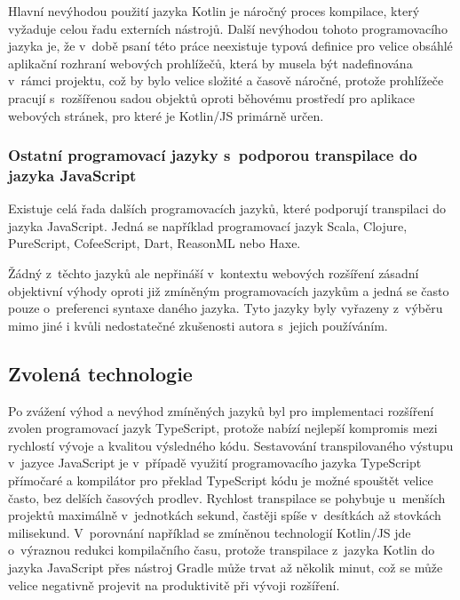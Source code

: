 Hlavní nevýhodou použití jazyka Kotlin je náročný proces kompilace, který vyžaduje celou řadu externích nástrojů. Další nevýhodou tohoto programovacího jazyka je, že v~době psaní této práce neexistuje typová definice pro velice obsáhlé aplikační rozhraní webových prohlížečů, která by musela být nadefinována v~rámci projektu, což by bylo velice složité a časově náročné, protože prohlížeče pracují s~rozšířenou sadou objektů oproti běhovému prostředí pro aplikace webových stránek, pro které je Kotlin/JS primárně určen.


\subsubsection{Ostatní programovací jazyky s~podporou transpilace do jazyka JavaScript}

Existuje celá řada dalších programovacích jazyků, které podporují transpilaci do jazyka JavaScript. Jedná se například programovací jazyk Scala, Clojure, PureScript, CofeeScript, Dart, ReasonML nebo Haxe.

Žádný z~těchto jazyků ale nepřináší v~kontextu webových rozšíření zásadní objektivní výhody oproti již zmíněným programovacích jazykům a jedná se často pouze o~preferenci syntaxe daného jazyka. Tyto jazyky byly vyřazeny z~výběru mimo jiné i kvůli nedostatečné zkušenosti autora s~jejich používáním.  

\subsection{Zvolená technologie}

Po zvážení výhod a nevýhod zmíněných jazyků byl pro implementaci rozšíření zvolen programovací jazyk TypeScript, protože nabízí nejlepší kompromis mezi rychlostí vývoje a kvalitou výsledného kódu. Sestavování transpilovaného výstupu v~jazyce JavaScript je v~případě využití programovacího jazyka TypeScript přímočaré a kompilátor pro překlad TypeScript kódu je možné spouštět velice často, bez delších časových prodlev. Rychlost transpilace se pohybuje u~menších projektů maximálně v~jednotkách sekund, častěji spíše v~desítkách až stovkách milisekund. V~porovnání například se zmíněnou technologií Kotlin/JS jde o~výraznou redukci kompilačního času, protože transpilace z~jazyka Kotlin do jazyka JavaScript přes nástroj Gradle může trvat až několik minut, což se může velice negativně projevit na produktivitě při vývoji rozšíření.

